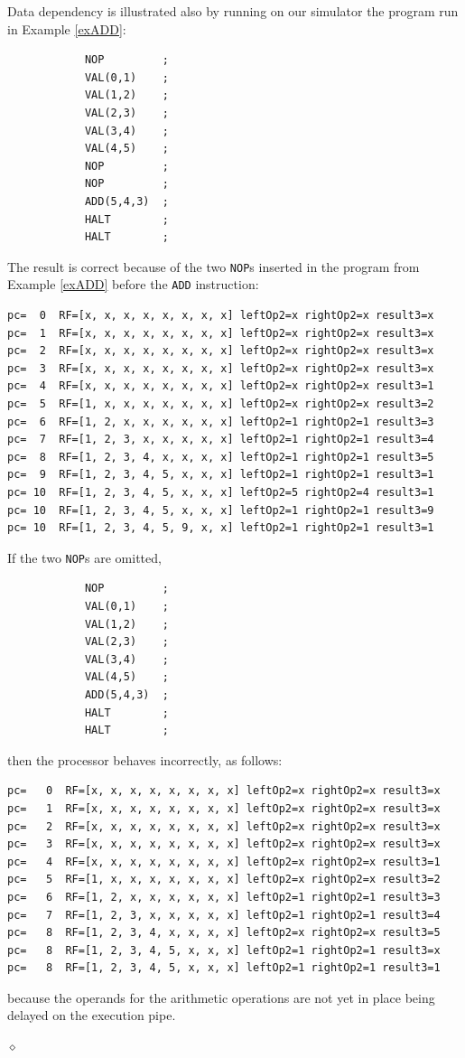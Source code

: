 \begin{exemplu}\label{dataDepSim}
Data dependency is illustrated also by running on our simulator the  program run in Example \ref{exADD}:
\begin{verbatim}
            NOP         ;
            VAL(0,1)    ;
            VAL(1,2)    ;
            VAL(2,3)    ;
            VAL(3,4)    ;
            VAL(4,5)    ;
            NOP         ;
            NOP         ;
            ADD(5,4,3)  ;
            HALT        ;
            HALT        ;
\end{verbatim}
The result is correct because of the two {\tt NOP}s inserted in the program from Example \ref{exADD} before the {\tt ADD} instruction:
{\small
\begin{verbatim}
pc=  0  RF=[x, x, x, x, x, x, x, x] leftOp2=x rightOp2=x result3=x
pc=  1  RF=[x, x, x, x, x, x, x, x] leftOp2=x rightOp2=x result3=x
pc=  2  RF=[x, x, x, x, x, x, x, x] leftOp2=x rightOp2=x result3=x
pc=  3  RF=[x, x, x, x, x, x, x, x] leftOp2=x rightOp2=x result3=x
pc=  4  RF=[x, x, x, x, x, x, x, x] leftOp2=x rightOp2=x result3=1
pc=  5  RF=[1, x, x, x, x, x, x, x] leftOp2=x rightOp2=x result3=2
pc=  6  RF=[1, 2, x, x, x, x, x, x] leftOp2=1 rightOp2=1 result3=3
pc=  7  RF=[1, 2, 3, x, x, x, x, x] leftOp2=1 rightOp2=1 result3=4
pc=  8  RF=[1, 2, 3, 4, x, x, x, x] leftOp2=1 rightOp2=1 result3=5
pc=  9  RF=[1, 2, 3, 4, 5, x, x, x] leftOp2=1 rightOp2=1 result3=1
pc= 10  RF=[1, 2, 3, 4, 5, x, x, x] leftOp2=5 rightOp2=4 result3=1
pc= 10  RF=[1, 2, 3, 4, 5, x, x, x] leftOp2=1 rightOp2=1 result3=9
pc= 10  RF=[1, 2, 3, 4, 5, 9, x, x] leftOp2=1 rightOp2=1 result3=1
\end{verbatim}
}
If the two {\tt NOP}s are omitted,
\begin{verbatim}
            NOP         ;
            VAL(0,1)    ;
            VAL(1,2)    ;
            VAL(2,3)    ;
            VAL(3,4)    ;
            VAL(4,5)    ;
            ADD(5,4,3)  ;
            HALT        ;
            HALT        ;
\end{verbatim}
then the processor behaves incorrectly, as follows:
\begin{verbatim}
pc=   0  RF=[x, x, x, x, x, x, x, x] leftOp2=x rightOp2=x result3=x
pc=   1  RF=[x, x, x, x, x, x, x, x] leftOp2=x rightOp2=x result3=x
pc=   2  RF=[x, x, x, x, x, x, x, x] leftOp2=x rightOp2=x result3=x
pc=   3  RF=[x, x, x, x, x, x, x, x] leftOp2=x rightOp2=x result3=x
pc=   4  RF=[x, x, x, x, x, x, x, x] leftOp2=x rightOp2=x result3=1
pc=   5  RF=[1, x, x, x, x, x, x, x] leftOp2=x rightOp2=x result3=2
pc=   6  RF=[1, 2, x, x, x, x, x, x] leftOp2=1 rightOp2=1 result3=3
pc=   7  RF=[1, 2, 3, x, x, x, x, x] leftOp2=1 rightOp2=1 result3=4
pc=   8  RF=[1, 2, 3, 4, x, x, x, x] leftOp2=x rightOp2=x result3=5
pc=   8  RF=[1, 2, 3, 4, 5, x, x, x] leftOp2=1 rightOp2=1 result3=x
pc=   8  RF=[1, 2, 3, 4, 5, x, x, x] leftOp2=1 rightOp2=1 result3=1
\end{verbatim}
because the operands for the arithmetic operations are not yet in place being delayed on the execution pipe.

$\diamond$
\end{exemplu}



